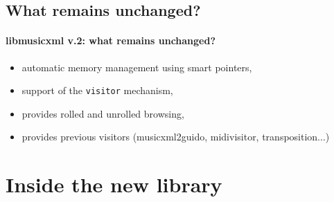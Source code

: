 \documentclass{beamer}
\begin{document}
\section{What remains unchanged?}
\begin{frame}
	\frametitle{libmusicxml v.2: what remains unchanged?}

\begin{itemize}
		\item automatic memory management using smart pointers,
		\item support of the \texttt{visitor} mechanism,
		\item provides rolled and unrolled browsing,
		\item provides previous visitors (musicxml2guido, midivisitor, transposition...)
	\end{itemize}
\end{frame}


\chapter{Inside the new library}
\end{document}

